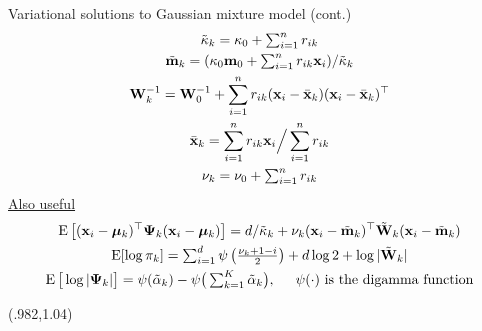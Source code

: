 \begin{frame}{Variational solutions to Gaussian mixture model (cont.)}
  \vspace{-20pt}
  \begin{align*}
  \begin{gathered}
    \tilde\kappa_k = \kappa_0 + \textstyle\sum_{i=1}^n r_{ik} \\
    \tilde{{\mathbf m}}_k = (\kappa_0{\mathbf m}_0 + \textstyle\sum_{i=1}^n r_{ik}{\mathbf x}_i) / \tilde\kappa_k \\
    {\mathbf W}_k^{-1} = {\mathbf W}_0^{-1} + \sum_{i=1}^n r_{ik}({\mathbf x}_i - \bar{{\mathbf x}}_k)({\mathbf x}_i - \bar{{\mathbf x}}_k)^\top \\
    \bar{{\mathbf x}}_k = \sum_{i=1}^n r_{ik}{\mathbf x}_i \Big/ \sum_{i=1}^n r_{ik} \\
    \nu_k = \nu_0 + \textstyle\sum_{i=1}^n r_{ik}
  \end{gathered} 
  \end{align*}
  \underline{Also useful}
  \begin{align*}
  \begin{gathered}
    \operatorname{E} \left[({\mathbf x}_i - {\bm\mu}_k)^\top {\bm\Psi}_k ({\mathbf x}_i - {\bm\mu}_k)  \right] = 
    d/\tilde\kappa_k + \nu_k({\mathbf x}_i - \tilde{{\mathbf m}}_k)^\top \tilde{{\mathbf W}}_k ({\mathbf x}_i - \tilde{{\mathbf m}}_k) \\
    \operatorname{E}[\log\pi_k] = \textstyle\sum_{i=1}^d \psi\left(\frac{\nu_k + 1 - i}{2} \right) + d \log 2 + \log |\tilde{{\mathbf W}}_k |  \\
    \operatorname{E}\big[\log|{\bm\Psi}_k|\big] = \psi(\tilde\alpha_k) - \psi\big(\textstyle\sum_{k=1}^K\tilde\alpha_k\big), \hspace{0.5cm} \psi(\cdot)\text{ is the digamma function}
  \end{gathered} 
  \end{align*}  
  
  \begin{textblock*}{3cm}(.982\textwidth,1.04\textheight)%
    \hyperlink{vigmm}{}      
  \end{textblock*} 
\end{frame}
